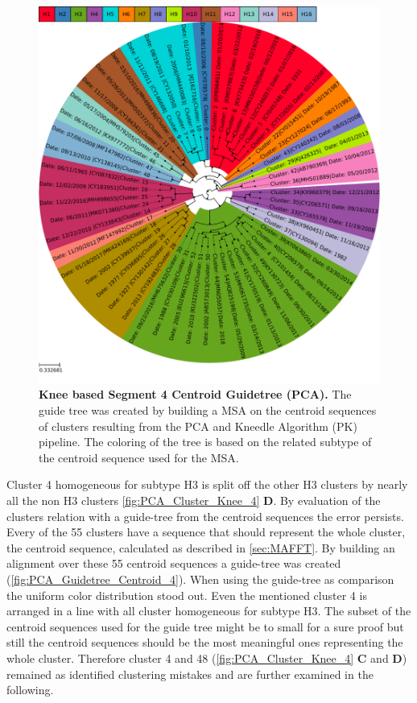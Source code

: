 \begin{figure}[!hbt]
    \centering
    \includegraphics[width=\textwidth]{PCA/Guidetree_segment_4_H_Centroid.pdf}
    \caption[Knee based Segment 4 Centroid Guidetree (\Acrshort{PCA})]{\textbf{Knee based Segment 4 Centroid Guidetree (\Acrshort{PCA}).} The guide tree was created by building a \gls{MSA} on the centroid sequences of clusters resulting from the \gls{PCA} and Kneedle Algorithm (PK) pipeline. The coloring of the tree is based on the related subtype of the centroid sequence used for the \gls{MSA}.}
    \label{fig:PCA_Guidetree_Centroid_4}
\end{figure}

Cluster 4 homogeneous for subtype H3 is split off the other H3 clusters by nearly all the non H3 clusters \autoref{fig:PCA_Cluster_Knee_4} \textbf{\textsf{D}}. By evaluation of the clusters relation with a guide-tree from the centroid sequences the error persists. Every of the 55 clusters have a sequence that should represent the whole cluster, the centroid sequence, calculated as described in \autoref{sec:MAFFT}. By building an alignment over these 55 centroid sequences a guide-tree was created (\autoref{fig:PCA_Guidetree_Centroid_4}). When using the guide-tree as comparison the uniform color distribution stood out. Even the mentioned cluster 4 is arranged in a line with all cluster homogeneous for subtype H3. The subset of the centroid sequences used for the guide tree might be to small for a sure proof but still the centroid sequences should be the most meaningful ones representing the whole cluster. Therefore cluster 4 and 48 (\autoref{fig:PCA_Cluster_Knee_4} \textbf{\textsf{C}} and \textbf{\textsf{D}}) remained as identified clustering mistakes and are further examined in the following.

